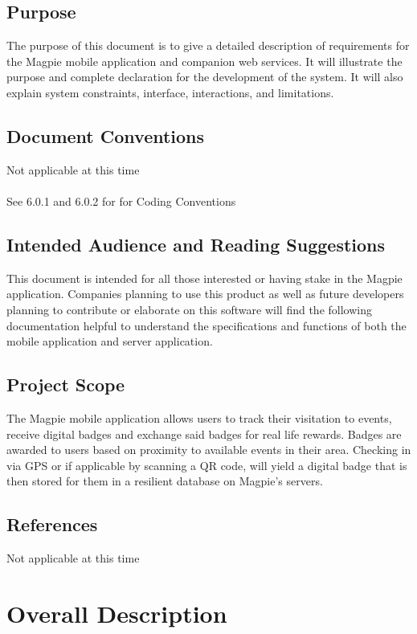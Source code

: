 \documentclass{scrreprt}
\begin{document}
\section{Purpose}
The purpose of this document is to give a detailed description of requirements for
the Magpie mobile application and companion web services. It will illustrate the purpose
and complete declaration for the development of the system.  It will also explain system
constraints, interface, interactions, and limitations.

\section{Document Conventions}
Not applicable at this time \\ \\
See 6.0.1 and 6.0.2 for for Coding Conventions

\section{Intended Audience and Reading Suggestions}
This document is intended for all those interested or having stake in the Magpie
application.  Companies planning to use this product as well as future developers
planning to contribute or elaborate on this software will find the following documentation
helpful to understand the specifications and functions of both the mobile application and server application.

\section{Project Scope}
The Magpie mobile application allows users to track their visitation to events,
receive digital badges and exchange said badges for real life rewards. Badges are awarded
to users based on proximity to available events in their area.  Checking in via GPS or
if applicable by scanning a QR code, will yield a digital badge that is then stored for them
in a resilient database on Magpie's servers.

\section{References}
Not applicable at this time

\chapter{Overall Description}
\end{document}
